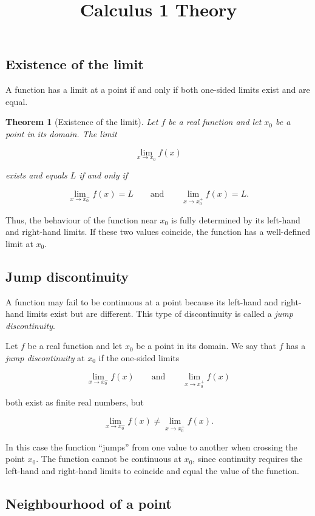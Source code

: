 \documentclass[11pt,a4paper]{article} \usepackage[T1]{fontenc}
\theoremstyle{plain} \newtheorem{theorem}{Theorem} \title{Calculus 1 Theory}
\begin{document}
\subsection*{Existence of the limit}

A function has a limit at a point if and only if both one-sided limits exist
and are equal.

\begin{theorem}
[Existence of the limit] Let $f$ be a real function and let $x_0$ be a point in
its domain. The limit

\[
\lim_{x \to x_0} f(x)
\]

exists and equals $L$ if and only if

\[
\lim_{x \to x_0^-} f(x) = L \qquad \text{and} \qquad \lim_{x \to x_0^+} f(x) = L.
\]

\end{theorem}

Thus, the behaviour of the function near $x_0$ is fully determined by its
left-hand and right-hand limits. If these two values coincide, the function has
a well-defined limit at $x_0$.

\subsection*{Jump discontinuity}

A function may fail to be continuous at a point because its left-hand and
right-hand limits exist but are different. This type of discontinuity is called
a \emph{jump discontinuity}.

\begin{definition}
 Let $f$ be a real function and let $x_0$ be a point in its
domain. We say that $f$ has a \emph{jump discontinuity} at $x_0$ if the
one-sided limits

\[
\lim_{x \to x_0^-} f(x) \qquad \text{and} \qquad \lim_{x \to x_0^+} f(x)
\]

both exist as finite real numbers, but

\[
\lim_{x \to x_0^-} f(x) \ne \lim_{x \to x_0^+} f(x).
\]

\end{definition}

In this case the function “jumps” from one value to another when crossing the
point $x_0$. The function cannot be continuous at $x_0$, since continuity
requires the left-hand and right-hand limits to coincide and equal the value of
the function.

\subsection{Neighbourhood of a point}
\end{document}
